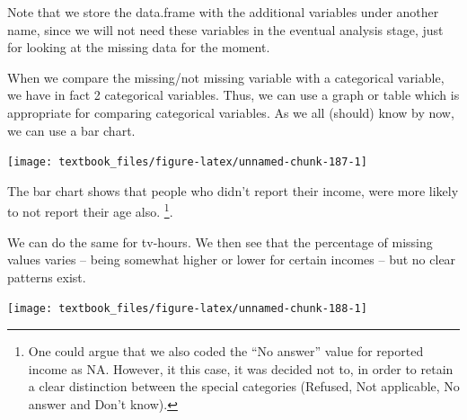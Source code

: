 \documentclass[]{tufte-book}
\newenvironment{Shaded}{}{}
\newcommand{\DataTypeTok}[1]{\textcolor[rgb]{0.56,0.13,0.00}{#1}}
\newcommand{\KeywordTok}[1]{\textcolor[rgb]{0.00,0.44,0.13}{\textbf{#1}}}
\newcommand{\NormalTok}[1]{#1}
\newcommand{\OperatorTok}[1]{\textcolor[rgb]{0.40,0.40,0.40}{#1}}
\newcommand{\StringTok}[1]{\textcolor[rgb]{0.25,0.44,0.63}{#1}}
\begin{document}
Note that we store the data.frame with the additional variables under another name, since we will not need these variables in the eventual analysis stage, just for looking at the missing data for the moment.

When we compare the missing/not missing variable with a categorical variable, we have in fact 2 categorical variables. Thus, we can use a graph or table which is appropriate for comparing categorical variables. As we all (should) know by now, we can use a bar chart.

\begin{Shaded}
\end{Shaded}

\texttt{[image: textbook\_files/figure-latex/unnamed-chunk-187-1]}

The bar chart shows that people who didn't report their income, were more likely to not report their age also. \footnote{One could argue that we also coded the ``No answer'' value for reported income as NA. However, it this case, it was decided not to, in order to retain a clear distinction between the special categories (Refused, Not applicable, No answer and Don't know).}.

We can do the same for tv-hours. We then see that the percentage of missing values varies -- being somewhat higher or lower for certain incomes -- but no clear patterns exist.

\begin{Shaded}
\end{Shaded}

\texttt{[image: textbook\_files/figure-latex/unnamed-chunk-188-1]}
\end{document}
